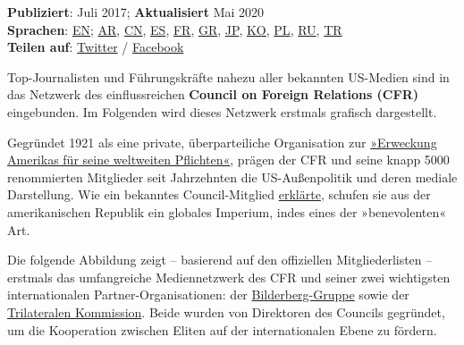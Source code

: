 \textbf{Publiziert}: Juli 2017; \textbf{Aktualisiert} Mai 2020\\
\textbf{Sprachen}:
\href{https://swprs.org/the-american-empire-and-its-media/}{EN};
\href{https://swprs.files.wordpress.com/2020/02/american-empire-media-arabic.png}{AR},
\href{https://swprs.files.wordpress.com/2019/12/american-empire-media-chinese.png}{CN},
\href{https://swprs.files.wordpress.com/2019/12/american-empire-media-spanish.pdf}{ES},
\href{https://swprs.files.wordpress.com/2019/12/american-empire-media-french.pdf}{FR},
\href{https://swprs.files.wordpress.com/2019/12/american-empire-media-greek.pdf}{GR},
\href{https://swprs.files.wordpress.com/2019/12/american-empire-media-japanese.pdf}{JP},
\href{https://swprs.files.wordpress.com/2019/12/american-empire-media-korean.pdf}{KO},
\href{https://swprs.files.wordpress.com/2019/12/american-empire-media-polish.pdf}{PL},
\href{https://swprs.files.wordpress.com/2019/12/american-empire-media-russian.pdf}{RU},
\href{https://swprs.org/the-american-empire-and-its-media/american-empire-media-turkish/}{TR}\\
\textbf{Teilen auf}:
\href{https://twitter.com/intent/tweet?url=https://swprs.org/das-american-empire-und-seine-medien/}{Twitter}
/
\href{https://www.facebook.com/share.php?u=https://swprs.org/das-american-empire-und-seine-medien/}{Facebook}

Top-Journalisten und Führungskräfte nahezu aller bekannten US-Medien
sind in das Netzwerk des einflussreichen \textbf{Council on Foreign
Relations (CFR)} eingebunden. Im Folgenden wird dieses Netzwerk erstmals
grafisch dargestellt.

Gegründet 1921 als eine private, überparteiliche Organisation zur
\href{http://www.nytimes.com/1971/11/21/archives/is-it-a-club-seminar-presidium-invisible-government-the-council-on-.html}{»Erweckung
Amerikas für seine weltweiten Pflichten«}, prägen der CFR und seine
knapp 5000 renommierten Mitglieder seit Jahrzehnten die US-Außenpolitik
und deren mediale Darstellung. Wie ein bekanntes Council-Mitglied
\href{http://carnegieendowment.org/1998/06/01/benevolent-empire-pub-275}{erklärte},
schufen sie aus der amerikanischen Republik ein globales Imperium, indes
eines der »benevolenten« Art.

Die folgende Abbildung zeigt -- basierend auf den offiziellen
Mitgliederlisten -- erstmals das umfangreiche Mediennetzwerk des CFR und
seiner zwei wichtigsten internationalen Partner-Organisationen: der
\href{https://en.wikipedia.org/wiki/Bilderberg_Group}{Bilderberg-Gruppe}
sowie der
\href{https://en.wikipedia.org/wiki/Trilateral_Commission}{Trilateralen
Kommission}. Beide wurden von Direktoren des Councils gegründet, um die
Kooperation zwischen Eliten auf der internationalen Ebene zu fördern.

